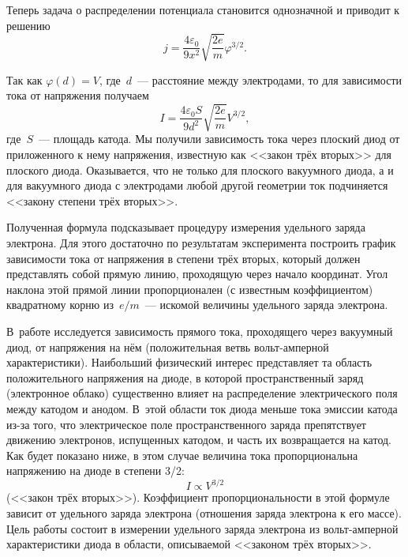 
Теперь задача о распределении потенциала становится однозначной и приводит к
решению
\begin{equation*}
    j=\frac{4\varepsilon_0}{9x^2}\sqrt{\frac{2e}{m}}\varphi^{3/2}.
\end{equation*}

Так как $\varphi(d)=V$, где~$d$~--- расстояние между электродами, то для
зависимости тока от напряжения получаем
\begin{equation*}
    I=\frac{4\varepsilon_0 S}{9d^2}\sqrt{\frac{2e}{m}}V^{3/2},
\end{equation*}
где~$S$~--- площадь катода. Мы получили зависимость тока через плоский диод от
приложенного к нему напряжения, известную как <<закон трёх вторых>> для плоского
диода. Оказывается, что не только для плоского вакуумного диода, а и для
вакуумного диода с электродами любой другой геометрии ток подчиняется <<закону
степени трёх вторых>>.

Полученная формула подсказывает процедуру измерения удельного заряда электрона.
Для этого достаточно по
результатам эксперимента построить график зависимости тока от напряжения в
степени трёх вторых, который должен
представлять собой прямую линию, проходящую через начало координат. Угол наклона
этой прямой линии пропорционален (с известным коэффициентом) квадратному корню
из~$e/m$~--- искомой величины удельного заряда электрона.
\todo[inline,color=cyan]{<---}

В~работе исследуется зависимость прямого тока, проходящего через вакуумный диод,
от напряжения на нём (положительная ветвь вольт-амперной характеристики).
Наибольший физический интерес представляет та область положительного напряжения
на диоде, в которой пространственный заряд (электронное облако) существенно
влияет на распределение электрического поля между катодом и анодом. В~этой
области ток диода меньше тока эмиссии катода из-за того, что электрическое поле
пространственного заряда препятствует движению электронов, испущенных катодом, и
часть их возвращается на катод. Как будет показано ниже, в этом случае величина
тока пропорциональна напряжению на диоде в степени 3/2:
\begin{equation}
	I\propto V^{3/2}
\end{equation}
(<<закон трёх вторых>>). Коэффициент пропорциональности в этой формуле зависит
от удельного заряда электрона (отношения заряда электрона к его массе). Цель
работы состоит в измерении удельного заряда электрона из вольт-амперной
характеристики диода в области, описываемой <<законом трёх вторых>>.

